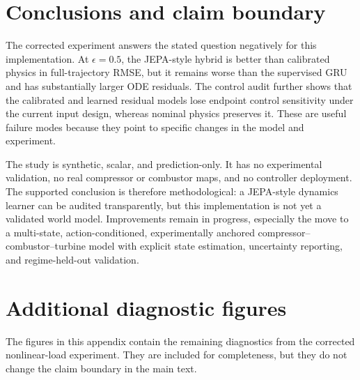 \documentclass[10pt,journal]{IEEEtran}
\begin{document}
\section{Conclusions and claim boundary}
The corrected experiment answers the stated question negatively for this implementation. At $\epsilon=0.5$, the JEPA-style hybrid is better than calibrated physics in full-trajectory RMSE, but it remains worse than the supervised GRU and has substantially larger ODE residuals. The control audit further shows that the calibrated and learned residual models lose endpoint control sensitivity under the current input design, whereas nominal physics preserves it. These are useful failure modes because they point to specific changes in the model and experiment.

The study is synthetic, scalar, and prediction-only. It has no experimental validation, no real compressor or combustor maps, and no controller deployment. The supported conclusion is therefore methodological: a JEPA-style dynamics learner can be audited transparently, but this implementation is not yet a validated world model. Improvements remain in progress, especially the move to a multi-state, action-conditioned, experimentally anchored compressor--combustor--turbine model with explicit state estimation, uncertainty reporting, and regime-held-out validation.



\clearpage
\onecolumn
\appendices
\section{Additional diagnostic figures}\label{app:diagnostics}
The figures in this appendix contain the remaining diagnostics from the corrected nonlinear-load experiment. They are included for completeness, but they do not change the claim boundary in the main text.
\end{document}
